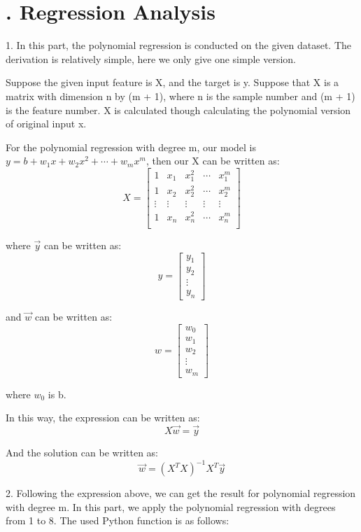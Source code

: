 \section*{\Large {}. Regression Analysis}
\begin{description}

\item{1. }
In this part, the polynomial regression is conducted on the given dataset. The derivation is relatively simple, here we only give one simple version.

Suppose the given input feature is X, and the target is y. Suppose that X is a matrix with dimension n by (m + 1), where n is the sample number and (m + 1) is the feature number. X is calculated though calculating the polynomial version of original input x. 

For the polynomial regression with degree m, our model is $y = b + w_1 x + w_2 x^2 + \cdots + w_m x^m$, then our X can be written as:
$$X = 
\begin{bmatrix}
	1 		& x_1	&	x_1^2 & \cdots & x_1^m \\
	1 		& x_2	& 	x_2^2 & \cdots & x_2^m \\
	\vdots	& \vdots & \vdots & \vdots & \vdots \\
	1 		& x_n	&	x_n^2 & \cdots & x_n^m \\
\end{bmatrix}
$$

where $\vec{y}$ can be written as:
$$y = \begin{bmatrix}
	y_1 \\
	y_2 \\
	\vdots \\
	y_n
\end{bmatrix}
$$

and $\vec{w}$ can be written as:
$$w = \begin{bmatrix}
	w_0 \\
	w_1 \\
	w_2 \\
	\vdots \\
	w_m
\end{bmatrix}
$$

where $w_0$ is b.

In this way, the expression can be written as:
$$X \vec{w} = \vec{y}$$

And the solution can be written as: $$\vec{w} = (X^T X)^{-1} X^T \vec{y}$$

\item{2. }
Following the expression above, we can get the result for polynomial regression with degree m. In this part, we apply the polynomial regression with degrees from 1 to 8. The used Python function is as follows:


\end{description}
